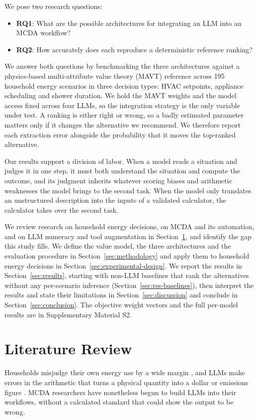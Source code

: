 \documentclass[final,3p,times]{elsarticle}
\begin{document}
We pose two research questions:
\begin{itemize}
\item \textbf{RQ1}: What are the possible architectures for integrating an LLM into an MCDA workflow?
\item \textbf{RQ2}: How accurately does each reproduce a deterministic reference ranking?
\end{itemize}

We answer both questions by benchmarking the three architectures against a physics-based multi-attribute value theory (MAVT) reference across 195 household energy scenarios in three decision types: HVAC setpoints, appliance scheduling and shower duration. We hold the MAVT weights and the model access fixed across four LLMs, so the integration strategy is the only variable under test. A ranking is either right or wrong, so a badly estimated parameter matters only if it changes the alternative we recommend. We therefore report each extraction error alongside the probability that it moves the top-ranked alternative.

Our results support a division of labor. When a model reads a situation and judges it in one step, it must both understand the situation and compute the outcome, and its judgment inherits whatever scoring biases and arithmetic weaknesses the model brings to the second task. When the model only translates an unstructured description into the inputs of a validated calculator, the calculator takes over the second task.

We review research on household energy decisions, on MCDA and its automation, and on LLM numeracy and tool augmentation in Section~\ref{sec:lit-review}, and identify the gap this study fills. We define the value model, the three architectures and the evaluation procedure in Section~\ref{sec:methodology} and apply them to household energy decisions in Section~\ref{sec:experimental-design}. We report the results in Section~\ref{sec:results}, starting with non-LLM baselines that rank the alternatives without any per-scenario inference (Section~\ref{sec:res-baselines}), then interpret the results and state their limitations in Section~\ref{sec:discussion} and conclude in Section~\ref{sec:conclusion}. The objective weight vectors and the full per-model results are in Supplementary Material S2.

\section{Literature Review}
\label{sec:lit-review}
Households misjudge their own energy use by a wide margin \cite{attari2010}, and LLMs make errors in the arithmetic that turns a physical quantity into a dollar or emissions figure \cite{imani2023mathprompter}. MCDA researchers have nonetheless begun to build LLMs into their workflows, without a calculated standard that could show the output to be wrong.
\end{document}
